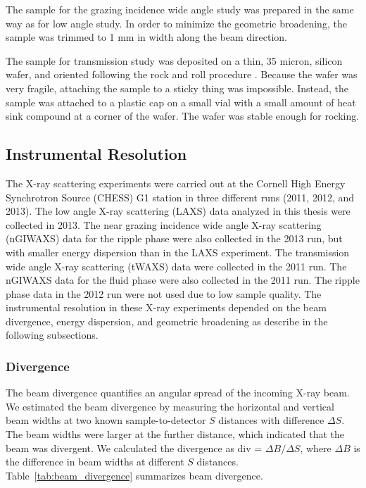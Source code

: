 The sample for the grazing incidence wide angle study was prepared in the same way 
as for low angle study. In order to minimize the geometric broadening, the 
sample was trimmed to 1 mm in width along the beam direction.

The sample for transmission study was deposited on a thin, 35 micron, silicon
wafer, and oriented following the rock and roll procedure \cite{Tristram-Nagle07_MMB}.  
Because the wafer was very fragile, attaching the sample to a sticky 
thing was impossible. Instead, the sample was attached to a plastic cap on 
a small vial with a small amount of heat sink compound at a corner of the 
wafer. The wafer was stable enough for rocking. 

\subsection{Instrumental Resolution}\label{sec:instrumental_resolution}
The X-ray scattering experiments were carried out at the Cornell 
High Energy Synchrotron Source (CHESS) G1 station in three different runs
(2011, 2012, and 2013). 
The low angle X-ray scattering (LAXS) data analyzed 
in this thesis were collected in 2013.
The near grazing incidence wide angle X-ray scattering (nGIWAXS) data
for the ripple phase were also collected
in the 2013 run, but with smaller energy dispersion than in the LAXS experiment.
The transmission wide angle X-ray scattering (tWAXS) data were collected
in the 2011 run. The nGIWAXS data for the fluid phase were also collected in
the 2011 run.
The ripple phase data in the 2012 run were not used
due to low sample quality.
The instrumental resolution in these X-ray experiments depended on the beam
divergence, energy dispersion, and geometric broadening 
as describe in the following subsections.

\subsubsection{Divergence}\label{sec:divergence}
The beam divergence quantifies an angular spread of the incoming X-ray
beam. We estimated the beam divergence by measuring the horizontal and 
vertical beam widths at two known sample-to-detector $S$ distances
with difference $\Delta S$. 
The beam widths were larger at the further distance, which indicated 
that the beam was divergent. 
We calculated the divergence as div = $\Delta B/\Delta S$, where
$\Delta B$ is the difference in beam widths at different $S$ distances.
Table~\ref{tab:beam_divergence} summarizes beam divergence.


